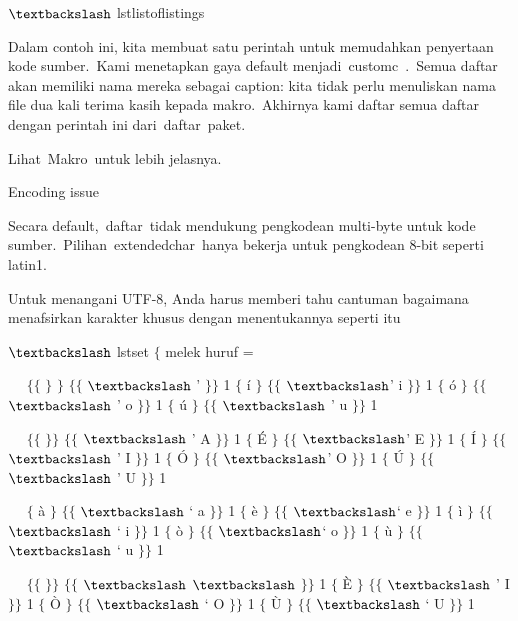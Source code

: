  $\textbackslash$ lstlistoflistings\par

Dalam contoh ini, kita membuat satu perintah untuk memudahkan penyertaan kode sumber. Kami menetapkan gaya default menjadi customc . Semua daftar akan memiliki nama mereka sebagai caption: kita tidak perlu menuliskan nama file dua kali terima kasih kepada makro. Akhirnya kami daftar semua daftar dengan perintah ini dari daftar paket.\par

Lihat Makro untuk lebih jelasnya.\par

Encoding issue \par

Secara default, daftar tidak mendukung pengkodean multi-byte untuk kode sumber. Pilihan extendedchar hanya bekerja untuk pengkodean 8-bit seperti latin1.\par

Untuk menangani UTF-8, Anda harus memberi tahu cantuman bagaimana menafsirkan karakter khusus dengan menentukannya seperti itu\par

 $\textbackslash$ lstset $ \{ $ melek huruf =\par

~~ $ \{ $$ \{ $ $ \} $ $ \} $ $ \{ $$ \{ $ $\textbackslash$ ' $ \} $$ \} $ 1 $ \{ $ í $ \} $ $ \{ $$ \{ $ $\textbackslash$' i $ \} $$ \} $ 1 $ \{ $ ó $ \} $ $ \{ $$ \{ $ $\textbackslash$ ' o $ \} $$ \} $ 1 $ \{ $ ú $ \} $ $ \{ $$ \{ $ $\textbackslash$ ' u $ \} $$ \} $ 1\par

~~ $ \{ $$ \{ $ $ \} $$ \} $ $ \{ $$ \{ $ $\textbackslash$ ' A $ \} $$ \} $ 1 $ \{ $ É $ \} $ $ \{ $$ \{ $ $\textbackslash$' E $ \} $$ \} $ 1 $ \{ $ Í $ \} $ $ \{ $$ \{ $ $\textbackslash$ ' I $ \} $$ \} $ 1 $ \{ $ Ó $ \} $ $ \{ $$ \{ $ $\textbackslash$' O $ \} $$ \} $ 1 $ \{ $ Ú $ \} $ $ \{ $$ \{ $ $\textbackslash$ ' U $ \} $$ \} $ 1\par

~~ $ \{ $ à $ \} $ $ \{ $$ \{ $ $\textbackslash$ ` a $ \} $$ \} $ 1 $ \{ $ è $ \} $ $ \{ $$ \{ $ $\textbackslash$` e $ \} $$ \} $ 1 $ \{ $ ì $ \} $ $ \{ $$ \{ $ $\textbackslash$ ` i $ \} $$ \} $ 1 $ \{ $ ò $ \} $ $ \{ $$ \{ $ $\textbackslash$` o $ \} $$ \} $ 1 $ \{ $ ù $ \} $ $ \{ $$ \{ $ $\textbackslash$ ` u $ \} $$ \} $ 1\par

~~ $ \{ $$ \{ $ $ \} $$ \} $ $ \{ $$ \{ $ $\textbackslash$ $\textbackslash$ $ \} $$ \} $ 1 $ \{ $ È $ \} $ $ \{ $$ \{ $ $\textbackslash$ ' I $ \} $$ \} $ 1 $ \{ $ Ò $ \} $ $ \{ $$ \{ $ $\textbackslash$ ` O $ \} $$ \} $ 1 $ \{ $ Ù $ \} $ $ \{ $$ \{ $ $\textbackslash$ ` U $ \} $$ \} $ 1\par

